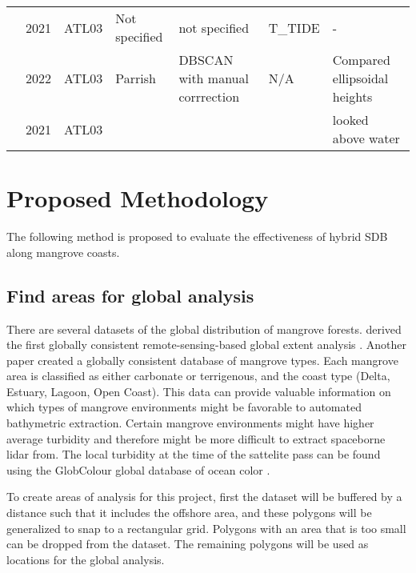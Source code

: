 \begin{landscape}
\begin{table}
\begin{tabular}{lllp{3cm}p{3cm}ll}
                  \citeauthor{Lee2021}                           & 2021 & ATL03   & Not specified                 & not specified                  & T\_TIDE         & -                            \\
                  \citeauthor{LeQuilleuc2022b}            & 2022 & ATL03   & Parrish                       & DBSCAN with manual corrrection & N/A             & Compared ellipsoidal heights \\
                  \citeauthor{Xu2022a}                            & 2021 & ATL03   &                               &                                &                 & looked above water           \\
                  \bottomrule
            \end{tabular}
      \end{table}
\end{landscape}

\chapter{Proposed Methodology}
The following method is proposed to evaluate the effectiveness of hybrid SDB along mangrove coasts.

\section{Find areas for global analysis}
There are several datasets of the global distribution of mangrove forests. \citeauthor{Giri2011b} derived the first globally consistent remote-sensing-based global extent analysis \parencite{Worthington2020}. Another paper \parencite{Worthington2020a} created a globally consistent database of mangrove types. Each mangrove area is classified as either carbonate or terrigenous, and the coast type (Delta, Estuary, Lagoon, Open Coast). This data can provide valuable information on which types of mangrove environments might be favorable to automated bathymetric extraction. Certain mangrove environments might have higher average turbidity and therefore might be more difficult to extract spaceborne lidar from. The local turbidity at the time of the sattelite pass can be found using the GlobColour global database of ocean color \parencite{Garnesson2019} . 

To create areas of analysis for this project, first the \citeauthor{Giri2011b} dataset will be buffered by a distance such that it includes the offshore area, and these polygons will be generalized to snap to a rectangular grid. Polygons with an area that is too small can be dropped from the dataset. The remaining polygons will be used as locations for the global analysis.

